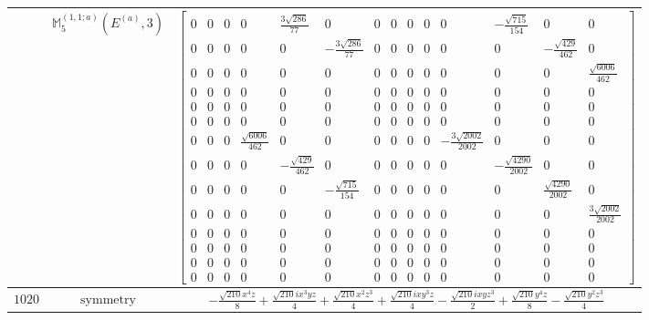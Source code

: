 \documentclass[fleqn,8pt,landscape]{jsarticle}
\begin{document}
\begin{longtable}{ccc}
$  $ & $ \mathbb{M}_{5}^{(1,1;a)}(E^{(a)},3) $ & $ \begin{bmatrix} 0 & 0 & 0 & 0 & \frac{3 \sqrt{286}}{77} & 0 & 0 & 0 & 0 & 0 & 0 & - \frac{\sqrt{715}}{154} & 0 & 0 \\ 0 & 0 & 0 & 0 & 0 & - \frac{3 \sqrt{286}}{77} & 0 & 0 & 0 & 0 & 0 & 0 & - \frac{\sqrt{429}}{462} & 0 \\ 0 & 0 & 0 & 0 & 0 & 0 & 0 & 0 & 0 & 0 & 0 & 0 & 0 & \frac{\sqrt{6006}}{462} \\ 0 & 0 & 0 & 0 & 0 & 0 & 0 & 0 & 0 & 0 & 0 & 0 & 0 & 0 \\ 0 & 0 & 0 & 0 & 0 & 0 & 0 & 0 & 0 & 0 & 0 & 0 & 0 & 0 \\ 0 & 0 & 0 & 0 & 0 & 0 & 0 & 0 & 0 & 0 & 0 & 0 & 0 & 0 \\ 0 & 0 & 0 & \frac{\sqrt{6006}}{462} & 0 & 0 & 0 & 0 & 0 & 0 & - \frac{3 \sqrt{2002}}{2002} & 0 & 0 & 0 \\ 0 & 0 & 0 & 0 & - \frac{\sqrt{429}}{462} & 0 & 0 & 0 & 0 & 0 & 0 & - \frac{\sqrt{4290}}{2002} & 0 & 0 \\ 0 & 0 & 0 & 0 & 0 & - \frac{\sqrt{715}}{154} & 0 & 0 & 0 & 0 & 0 & 0 & \frac{\sqrt{4290}}{2002} & 0 \\ 0 & 0 & 0 & 0 & 0 & 0 & 0 & 0 & 0 & 0 & 0 & 0 & 0 & \frac{3 \sqrt{2002}}{2002} \\ 0 & 0 & 0 & 0 & 0 & 0 & 0 & 0 & 0 & 0 & 0 & 0 & 0 & 0 \\ 0 & 0 & 0 & 0 & 0 & 0 & 0 & 0 & 0 & 0 & 0 & 0 & 0 & 0 \\ 0 & 0 & 0 & 0 & 0 & 0 & 0 & 0 & 0 & 0 & 0 & 0 & 0 & 0 \\ 0 & 0 & 0 & 0 & 0 & 0 & 0 & 0 & 0 & 0 & 0 & 0 & 0 & 0 \end{bmatrix} $ \\ \hline
$ 1020 $ & $ \text{symmetry} $ & $ - \frac{\sqrt{210} x^{4} z}{8} + \frac{\sqrt{210} i x^{3} y z}{4} + \frac{\sqrt{210} x^{2} z^{3}}{4} + \frac{\sqrt{210} i x y^{3} z}{4} - \frac{\sqrt{210} i x y z^{3}}{2} + \frac{\sqrt{210} y^{4} z}{8} - \frac{\sqrt{210} y^{2} z^{3}}{4} $ \\

\end{longtable}
\end{document}
